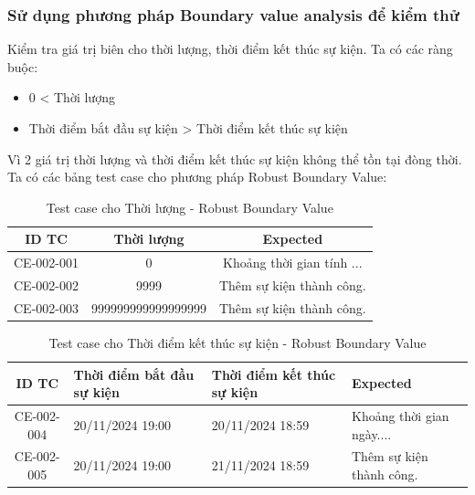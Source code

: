 \documentclass[a4paper, 12pt]{article}
\begin{document}
\subsubsection{Sử dụng phương pháp Boundary value analysis để kiểm thử}
Kiểm tra giá trị biên cho thời lượng, thời điểm kết thúc sự kiện. Ta có các ràng buộc:
\begin{itemize}
    \item 0 < Thời lượng
    \item Thời điểm bắt đầu sự kiện > Thời điểm kết thúc sự kiện
\end{itemize}
Vì 2 giá trị thời lượng và thời điểm kết thúc sự kiện không thể tồn tại đòng thời. Ta có các bảng test case cho phương pháp Robust Boundary Value:
\begin{table}[H]
    \centering
    \begin{tabular}{|c|c|c|}
        \hline
        ID TC & Thời lượng & Expected \\
        \hline
        CE-002-001 & 0 & Khoảng thời gian tính ... \\
        \hline
        CE-002-002 & 9999 & Thêm sự kiện thành công. \\
        \hline
        CE-002-003 & 999999999999999999 & Thêm sự kiện thành công. \\
        \hline
    \end{tabular}
    \caption{Test case cho Thời lượng - Robust Boundary Value}
    \label{tab:my_label}
\end{table}
\begin{table}[H]
    \centering
    \begin{tabular}{|c|p{3cm}|p{3cm}|p{4cm}|}
        \hline
        ID TC & Thời điểm bắt đầu sự kiện & Thời điểm kết thúc sự kiện &  Expected \\
        \hline
        CE-002-004 & 20/11/2024 19:00 & 20/11/2024 18:59 & Khoảng thời gian ngày....\\
        \hline
        CE-002-005 & 20/11/2024 19:00 & 21/11/2024 18:59 & Thêm sự kiện thành công. \\
        \hline
    \end{tabular}
    \caption{Test case cho Thời điểm kết thúc sự kiện - Robust Boundary Value}
    \label{tab:my_label}
\end{table}
\end{document}
